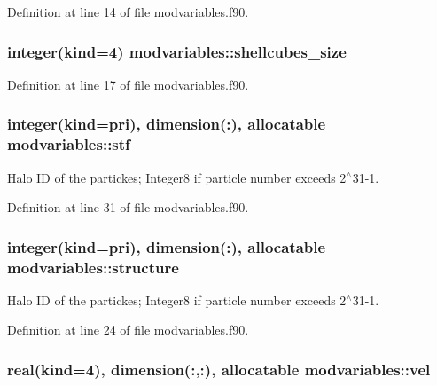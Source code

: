 Definition at line 14 of file modvariables.\-f90.

\hypertarget{classmodvariables_a9b7ba2cda6114449e99e9f7f348d4c32}{
\subsubsection[{shellcubes\-\_\-size}]{\setlength{\rightskip}{0pt plus 5cm}integer(kind=4) modvariables\-::shellcubes\-\_\-size}}\label{classmodvariables_a9b7ba2cda6114449e99e9f7f348d4c32}


Definition at line 17 of file modvariables.\-f90.

\hypertarget{classmodvariables_a5b99e0cc82073c06969e0fe6caa06357}{
\subsubsection[{stf}]{\setlength{\rightskip}{0pt plus 5cm}integer(kind=pri), dimension(\-:), allocatable modvariables\-::stf}}\label{classmodvariables_a5b99e0cc82073c06969e0fe6caa06357}


Halo I\-D of the partickes; Integer8 if particle number exceeds 2$^\wedge$31-\/1. 



Definition at line 31 of file modvariables.\-f90.

\hypertarget{classmodvariables_a93c25eb46b5370bd8153733e03f3008d}{
\subsubsection[{structure}]{\setlength{\rightskip}{0pt plus 5cm}integer(kind=pri), dimension(\-:), allocatable modvariables\-::structure}}\label{classmodvariables_a93c25eb46b5370bd8153733e03f3008d}


Halo I\-D of the partickes; Integer8 if particle number exceeds 2$^\wedge$31-\/1. 



Definition at line 24 of file modvariables.\-f90.

\hypertarget{classmodvariables_a9f11e44143a4c5cd47740e58712bbe1c}{
\subsubsection[{vel}]{\setlength{\rightskip}{0pt plus 5cm}real(kind=4), dimension(\-:,\-:), allocatable modvariables\-::vel}}\label{classmodvariables_a9f11e44143a4c5cd47740e58712bbe1c}


